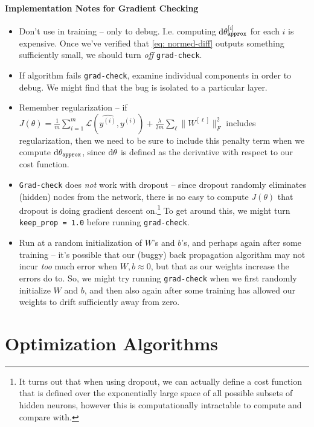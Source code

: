 \documentclass[12pt]{article}
\begin{document}
\paragraph{Implementation Notes for Gradient Checking}
\begin{itemize}   \item Don't use in training -- only to debug. I.e. computing $\operatorname{d}\!{\theta}_{\texttt{approx}}^{[i]}$ for each $i$ is expensive. Once we've verified that \ref{eq: normed-diff} outputs something sufficiently small, we should turn \emph{off} \texttt{grad-check}.
  \item If algorithm fails \texttt{grad-check}, examine individual components in order to debug. We might find that the bug is isolated to a particular layer. 
  \item Remember regularization -- if $J(\theta) = \frac{1}{m} \sum_{i=1}^m \mathcal L(\hat {y^{(i)}}, y^{(i)}) + \frac{\lambda}{2m} \sum_\ell \|W^{[\ell]}\|_F^2$ includes regularization, then we need to be sure to include this penalty term when we compute $\operatorname{d}\!{\theta}_{\texttt{approx}}$, since $\operatorname{d}\!{\theta}$ is defined as the derivative with respect to our cost function.
  \item \texttt{Grad-check} does \emph{not} work with dropout -- since dropout randomly eliminates (hidden) nodes from the network, there is no easy to compute $J(\theta)$ that dropout is doing gradient descent on.\footnote{It turns out that when using dropout, we can actually define a cost function that is defined over the exponentially large space of all possible subsets of hidden neurons, however this is computationally intractable to compute and compare with.} To get around this, we might turn \texttt{keep\_prop = 1.0} before running \texttt{grad-check}.
  \item Run at a random initialization of $W$'s and $b$'s, and perhaps again after some training -- it's possible that our (buggy) back propagation algorithm may not incur \emph{too} much error when $W, b \approx 0$, but that as our weights increase the errors do to. So, we might try running \texttt{grad-check} when we first randomly initialize $W$ and $b$, and then also again after some training has allowed our weights to drift sufficiently away from zero.  \end{itemize}

\section{Optimization Algorithms}
\end{document}
